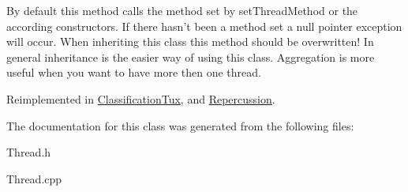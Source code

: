 \label{classThread_adc91220b96d25109b5f3ea73f8a75947}
By default this method calls the method set by setThreadMethod or the according constructors. If there hasn't been a method set a null pointer exception will occur. When inheriting this class this method should be overwritten! In general inheritance is the easier way of using this class. Aggregation is more useful when you want to have more then one thread. 

Reimplemented in \hyperlink{classClassificationTux_aa3824ae61c0d73ebff62c641793dc3ff}{ClassificationTux}, and \hyperlink{classRepercussion_a903a946946c3393ea3a063d594e0fb91}{Repercussion}.

The documentation for this class was generated from the following files:\begin{DoxyCompactItemize}
\item 
Thread.h\item 
Thread.cpp\end{DoxyCompactItemize}
